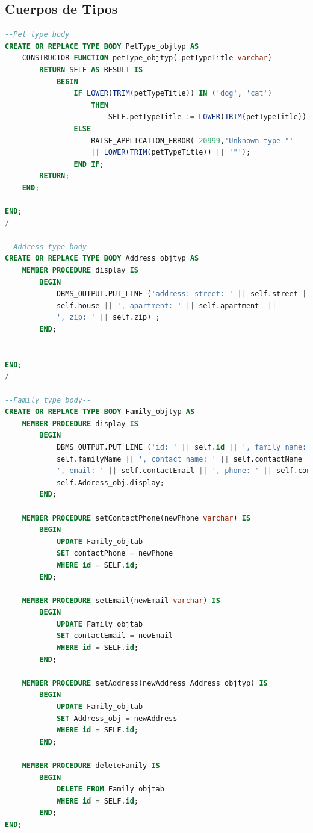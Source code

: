\documentclass{FR16}
\begin{document}
\subsection{Cuerpos de Tipos}
\begin{lstlisting}[language=Sql, basicstyle=\scriptsize]
--Pet type body
CREATE OR REPLACE TYPE BODY PetType_objtyp AS 
    CONSTRUCTOR FUNCTION petType_objtyp( petTypeTitle varchar)
        RETURN SELF AS RESULT IS
            BEGIN
                IF LOWER(TRIM(petTypeTitle)) IN ('dog', 'cat')
                    THEN 
                        SELF.petTypeTitle := LOWER(TRIM(petTypeTitle));
                ELSE
                    RAISE_APPLICATION_ERROR(-20999,'Unknown type "' 
                    || LOWER(TRIM(petTypeTitle)) || '"');
                END IF;
        RETURN;
    END;

END;
/

--Address type body--
CREATE OR REPLACE TYPE BODY Address_objtyp AS
    MEMBER PROCEDURE display IS
        BEGIN
            DBMS_OUTPUT.PUT_LINE ('address: street: ' || self.street || ', house: '||
            self.house || ', apartment: ' || self.apartment  ||
            ', zip: ' || self.zip) ;
        END;


END;
/

--Family type body--
CREATE OR REPLACE TYPE BODY Family_objtyp AS
    MEMBER PROCEDURE display IS
        BEGIN
            DBMS_OUTPUT.PUT_LINE ('id: ' || self.id || ', family name: '||
            self.familyName || ', contact name: ' || self.contactName ||
            ', email: ' || self.contactEmail || ', phone: ' || self.contactPhone);
            self.Address_obj.display;
        END;

    MEMBER PROCEDURE setContactPhone(newPhone varchar) IS
        BEGIN 
            UPDATE Family_objtab 
            SET contactPhone = newPhone
            WHERE id = SELF.id;
        END;

    MEMBER PROCEDURE setEmail(newEmail varchar) IS
        BEGIN 
            UPDATE Family_objtab 
            SET contactEmail = newEmail
            WHERE id = SELF.id;
        END;

    MEMBER PROCEDURE setAddress(newAddress Address_objtyp) IS
        BEGIN 
            UPDATE Family_objtab 
            SET Address_obj = newAddress
            WHERE id = SELF.id;
        END;  

    MEMBER PROCEDURE deleteFamily IS
        BEGIN 
            DELETE FROM Family_objtab 
            WHERE id = SELF.id;
        END;  
END;
         

\end{lstlisting}
\end{document}
